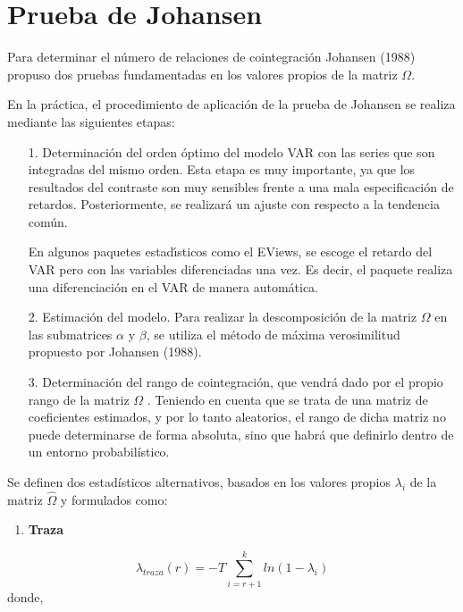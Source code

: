 \section{Prueba de Johansen}
Para determinar el n\'{u}mero de relaciones de cointegraci\'{o}n Johansen (1988) propuso dos pruebas fundamentadas en los valores propios de la matriz $\Omega$.\newline

En la pr\'{a}ctica, el procedimiento de aplicaci\'{o}n de la prueba de Johansen se realiza mediante las siguientes etapas:

\begin{enumerate}
      \item[1.] Determinaci\'{o}n del orden \'{o}ptimo del modelo VAR con las series que son integradas del mismo orden. Esta etapa es muy importante, ya que los resultados del contraste son muy sensibles frente a una mala especificaci\'{o}n de retardos. Posteriormente, se realizar\'{a} un ajuste con respecto a la tendencia com\'{u}n.
      
      En algunos paquetes estad\'{\i}sticos como el EViews, se escoge el retardo del VAR pero con las variables diferenciadas una vez. Es decir, el paquete realiza una diferenciaci\'{o}n en el VAR de manera autom\'{a}tica.

      \item[2.] Estimaci\'{o}n del modelo. Para realizar la descomposici\'{o}n de la matriz $\Omega$ en las submatrices $\alpha$ y $\beta$, se utiliza el m\'{e}todo de m\'{a}xima verosimilitud propuesto por Johansen (1988).
      \item[3.] Determinaci\'{o}n del rango de cointegraci\'{o}n, que vendr\'{a} dado por el propio rango de la matriz $\Omega$ . Teniendo en cuenta que se trata de una matriz de coeficientes estimados, y por lo tanto aleatorios, el rango de dicha matriz no puede determinarse de forma absoluta, sino que habr\'{a} que definirlo dentro de un entorno probabil\'{i}stico.
\end{enumerate}

Se definen dos estad\'{i}sticos alternativos, basados en los valores propios $\lambda_{i}$ de la matriz $\hat{\Omega }$ y formulados como:

%
%
%
%
%


\begin{enumerate}
\item \textbf{Traza}
\end{enumerate}
\[
\lambda_{traza}\left( r \right)=-T\sum\limits_{i=r+1}^k {ln(1-\lambda 
_{i})} 
\]
donde,

